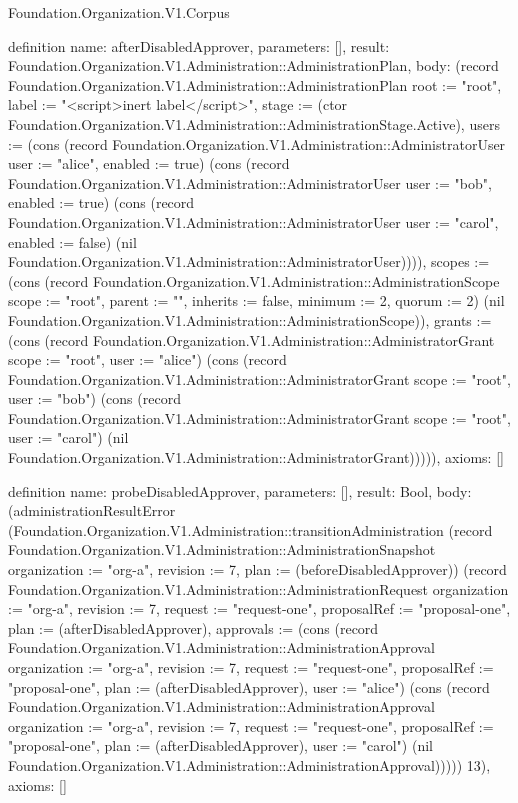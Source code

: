 \begin{lexlean}{Foundation.Organization.V1.Corpus}
\begin{semanticmodule}
definition{
  name: afterDisabledApprover,
  parameters: [],
  result: Foundation.Organization.V1.Administration::AdministrationPlan,
  body: (record Foundation.Organization.V1.Administration::AdministrationPlan {root := "root", label := "<script>inert label</script>", stage := (ctor Foundation.Organization.V1.Administration::AdministrationStage.Active), users := (cons (record Foundation.Organization.V1.Administration::AdministratorUser {user := "alice", enabled := true}) (cons (record Foundation.Organization.V1.Administration::AdministratorUser {user := "bob", enabled := true}) (cons (record Foundation.Organization.V1.Administration::AdministratorUser {user := "carol", enabled := false}) (nil Foundation.Organization.V1.Administration::AdministratorUser)))), scopes := (cons (record Foundation.Organization.V1.Administration::AdministrationScope {scope := "root", parent := "", inherits := false, minimum := 2, quorum := 2}) (nil Foundation.Organization.V1.Administration::AdministrationScope)), grants := (cons (record Foundation.Organization.V1.Administration::AdministratorGrant {scope := "root", user := "alice"}) (cons (record Foundation.Organization.V1.Administration::AdministratorGrant {scope := "root", user := "bob"}) (cons (record Foundation.Organization.V1.Administration::AdministratorGrant {scope := "root", user := "carol"}) (nil Foundation.Organization.V1.Administration::AdministratorGrant))))}),
  axioms: []
}

definition{
  name: probeDisabledApprover,
  parameters: [],
  result: Bool,
  body: (administrationResultError (Foundation.Organization.V1.Administration::transitionAdministration (record Foundation.Organization.V1.Administration::AdministrationSnapshot {organization := "org-a", revision := 7, plan := (beforeDisabledApprover)}) (record Foundation.Organization.V1.Administration::AdministrationRequest {organization := "org-a", revision := 7, request := "request-one", proposalRef := "proposal-one", plan := (afterDisabledApprover), approvals := (cons (record Foundation.Organization.V1.Administration::AdministrationApproval {organization := "org-a", revision := 7, request := "request-one", proposalRef := "proposal-one", plan := (afterDisabledApprover), user := "alice"}) (cons (record Foundation.Organization.V1.Administration::AdministrationApproval {organization := "org-a", revision := 7, request := "request-one", proposalRef := "proposal-one", plan := (afterDisabledApprover), user := "carol"}) (nil Foundation.Organization.V1.Administration::AdministrationApproval)))})) 13),
  axioms: []
}


\end{semanticmodule}
\end{lexlean}

